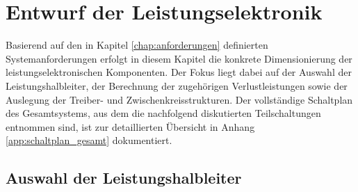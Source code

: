 \chapter{Entwurf der Leistungselektronik}
\label{chap:entwurf_leistung}

Basierend auf den in Kapitel \ref{chap:anforderungen} definierten Systemanforderungen erfolgt in diesem Kapitel die konkrete Dimensionierung der leistungselektronischen Komponenten. Der Fokus liegt dabei auf der Auswahl der Leistungshalbleiter, der Berechnung der zugehörigen Verlustleistungen sowie der Auslegung der Treiber- und Zwischenkreisstrukturen. Der vollständige Schaltplan des Gesamtsystems, aus dem die nachfolgend diskutierten Teilschaltungen entnommen sind, ist zur detaillierten Übersicht in Anhang \ref{app:schaltplan_gesamt} dokumentiert.


\section{Auswahl der Leistungshalbleiter}
\label{sec:mosfet_auswahl}

